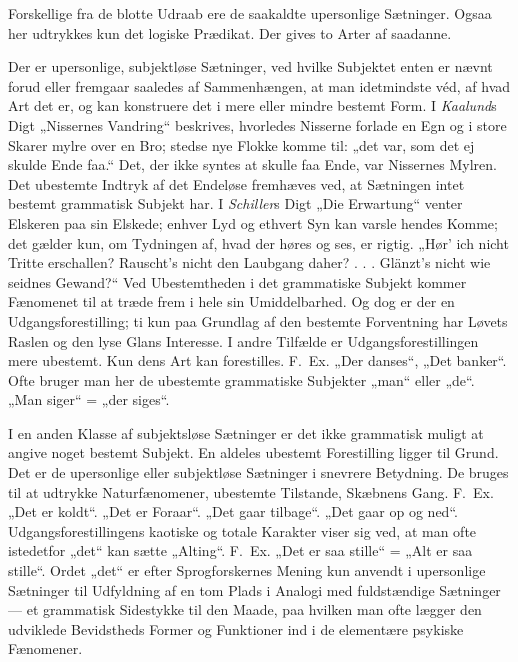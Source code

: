 \documentclass[12pt,a4paper]{book}
\newcommand{\apage}[1]{\marginnote{\footnotesize\textit{[#1]}}}
\begin{document}
Forskellige fra de blotte Udraab ere de saakaldte upersonlige
Sætninger. Ogsaa her udtrykkes kun det logiske Prædikat. Der gives to
Arter af saadanne.

Der er upersonlige, subjektløse Sætninger, ved hvilke Subjektet enten er
nævnt forud eller fremgaar saaledes af Sammenhængen, at man idetmindste
véd, af hvad Art det er, og kan konstruere det i mere eller mindre
bestemt Form. I \emph{Kaalund}s Digt „Nissernes Vandring“ beskrives,
hvorledes Nisserne forlade en Egn og i store Skarer mylre over en Bro;
stedse nye Flokke komme til: „det var, som det ej skulde \apage{86} Ende faa.“ Det,
der ikke syntes at skulle faa Ende, var Nissernes Mylren. Det ubestemte
Indtryk af det Endeløse fremhæves ved, at Sætningen intet bestemt
grammatisk Subjekt har. I \emph{Schiller}s Digt „Die Erwartung“ venter
Elskeren paa sin Elskede; enhver Lyd og ethvert Syn kan varsle hendes
Komme; det gælder kun, om Tydningen af, hvad der høres og ses, er rigtig.
„Hør' ich nicht Tritte erschallen? Rauscht's nicht den Laubgang daher? .
. . Glänzt's nicht wie seidnes Gewand?“ Ved Ubestemtheden i det
grammatiske Subjekt kommer Fænomenet til at træde frem i hele sin
Umiddelbarhed. Og dog er der en Udgangsforestilling; ti kun paa Grundlag
af den bestemte Forventning har Løvets Raslen og den lyse Glans
Interesse. I andre Tilfælde er Udgangsforestillingen mere ubestemt. Kun
dens Art kan forestilles. F.\ Ex. „Der danses“, „Det banker“. Ofte
bruger man her de ubestemte grammatiske Subjekter „man“ eller „de“.
„Man siger“ = „der siges“.

I en anden Klasse af subjektsløse Sætninger er det ikke grammatisk
muligt at angive noget bestemt Subjekt. En aldeles ubestemt Forestilling
ligger til Grund. Det er de upersonlige eller subjektløse Sætninger i
snevrere Betydning. De bruges til at udtrykke Naturfænomener, ubestemte
Tilstande, Skæbnens Gang. F.\ Ex. „Det er koldt“. „Det er Foraar“. „Det
gaar tilbage“. „Det gaar op og ned“. Udgangsforestillingens kaotiske og
totale Karakter viser sig ved, at man ofte istedetfor „det“ kan sætte
„Alting“. F.\ Ex. „Det er saa stille“ = „Alt er saa stille“. Ordet „det“
er efter Sprogforskernes Mening kun anvendt i upersonlige Sætninger til
Udfyldning af en tom Plads i Analogi med fuldstændige Sætninger --- et
grammatisk Sidestykke til den Maade, paa hvilken man ofte lægger den
udviklede Bevidstheds Former og Funktioner ind i de elementære psykiske
Fænomener.
\end{document}

